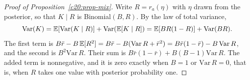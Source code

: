 \begin{proof}[Proof of Proposition~\ref{c20:prop-mix}]
Write $R=r_a(\eta)$ with $\eta$ drawn from the posterior, so that $K\mid R$ is
Binomial$(B,R)$. By the law of total variance,
\[\mathrm{Var}(K)=\mathbb{E}[\mathrm{Var}(K\mid R)]+\mathrm{Var}(\mathbb{E}[K\mid R])=\mathbb{E}[BR(1-R)]+\mathrm{Var}(BR).\]
The first term is $B\bar r-B\,\mathbb{E}[R^2]=B\bar r-B(\mathrm{Var}\,R+\bar r^2)=B\bar r(1-\bar r)-B\,\mathrm{Var}\,R$, and the second
is $B^2\mathrm{Var}\,R$. Their sum is $B\bar r(1-\bar r)+B(B-1)\mathrm{Var}\,R$. The added term is nonnegative, and
it is zero exactly when $B=1$ or $\mathrm{Var}\,R=0$, that is, when $R$ takes one value with posterior
probability one.
\end{proof}
